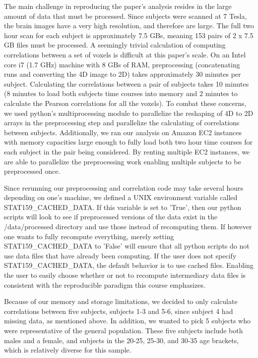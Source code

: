 \documentclass[11pt]{article}
\begin{document}
The main challenge in reproducing the paper's analysis resides in the large
amount of data that must be processed. Since subjects were scanned at 7 Tesla,
the brain images have a very high resolution, and therefore are large. The
full two hour scan for each subject is approximately 7.5 GBs, meaning 153
pairs of 2 x 7.5 GB files must be processed. A seemingly trivial calculation
of computing correlations between a set of voxels is difficult at this paper's
scale. On an Intel core i7 (1.7 GHz) machine with 8 GBs of RAM, preprocessing
(concatenating runs and converting the 4D image to 2D) takes approximately 30
minutes per subject. Calculating the correlations between a pair of subjects
takes 10 minutes (8 minutes to load both subjects time courses into memory and
2 minutes to calculate the Pearson correlations for all the voxels).  To
combat these concerns, we used python's multiprocessing module to parallelize
the reshaping of 4D to 2D arrays in the preprocessing step and parallelize the
calculating of correlations between subjects. Additionally, we ran our
analysis on Amazon EC2 instances with memory capacities large enough to fully
load both two hour time courses for each subject in the pair being considered.
By renting multiple EC2 instances, we are able to parallelize the
preprocessing work enabling multiple subjects to be preprocessed once.

Since rerunning our preprocessing and correlation code may take several hours
depending on one's machine, we defined a UNIX environment variable called
STAT159\_CACHED\_DATA. If this variable is set to 'True', then our python
scripts will look to see if preprocessed versions of the data exist in the
/data/processed directory and use those instead of recomputing them. If
however one wants to fully recompute everything, merely setting
STAT159\_CACHED\_DATA to 'False' will ensure that all python scripts do not
use data files that have already been computing. If the user does not specify
STAT159\_CACHED\_DATA, the default behavior is to use cached files. Enabling
the user to easily choose whether or not to recompute intermediary data files
is consistent with the reproducible paradigm this course emphasizes.

Because of our memory and storage limitations, we decided to only calculate 
correlations between five subjects, subjects 1-3 and 5-6, since subject 4 
had missing data, as mentioned above.  In addition, we wanted to pick 5 
subjects who were representative of the general population.  These five 
subjects include both males and a female, and subjects in the 20-25, 25-30,
and 30-35 age brackets, which is relatively diverse for this sample.
\end{document}
